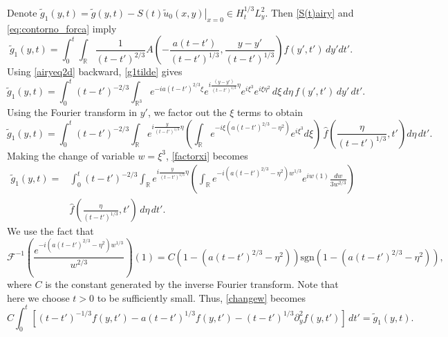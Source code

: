 \documentclass[11pt]{article}
\numberwithin{equation}{section}
\begin{document}
Denote $\tilde{g}_1(y,t) = \tilde{g}(y,t) - \left. S(t)\tilde{u}_0(x,y) \right|_{x=0} \in H^{1/3}_{t}L^{2}_{y}$. Then \eqref{S(t)airy} and \eqref{eq:contorno_forca} imply
\begin{equation}\label{g1tilde}
    \tilde{g}_1(y,t)=\int_0^t \int_{\mathbb{R}} \frac{1}{(t-t')^{2/3}} A\left( -\frac{a(t-t')}{(t-t')^{1/3}}, \frac{y-y'}{(t-t')^{1/3}} \right) f(y', t') \, dy' dt'.
\end{equation}
Using \eqref{airyeq2d} backward, \eqref{g1tilde} gives
\begin{equation}
\tilde{g}_1(y,t)=\int_{0}^{t} (t-t')^{-2/3} \int_{\mathbb{R}^3} e^{-ia(t-t')^{2/3}\xi} e^{i \frac{(y-y')}{(t-t')^{1/3}} \eta} e^{i \xi^3} e^{i \xi\eta^2} \, d\xi \, d\eta \, f(y', t') \, dy' \, dt'.\end{equation}
Using the Fourier transform in $y'$, we factor out the $\xi$ terms to obtain
\begin{equation}\label{factorxi}
\tilde{g}_1(y,t)=\int_{0}^{t} (t-t')^{-2/3} \int_{\mathbb{R}} e^{i \frac{y}{(t-t')^{1/3}} \eta}\left(\int_{\mathbb{R}} e^{-i \xi \left(a(t-t')^{2/3} - \eta^2\right)} e^{i \xi^3} d\xi\right)\, \hat{f} \left( \frac{\eta}{(t-t')^{1/3}}, t' \right) d\eta \, dt'.\end{equation}
Making the change of variable $w = \xi^3$, \eqref{factorxi} becomes
\begin{equation}\label{changew}\begin{aligned}
\tilde{g}_1(y,t)=&\int_{0}^{t} (t-t')^{-2/3} \int_{\mathbb{R}} e^{i \frac{y}{(t-t')^{1/3}} \eta} \left(\int_{\mathbb{R}}e^{-i \left(a(t-t')^{2/3} - \eta^2\right) w^{1/3}} e^{iw(1)}\frac{dw}{3w^{2/3}}\right)\\ &\hat{f}\left(\frac{\eta}{(t-t')^{1/3}}, t'\right) \, d\eta \, dt'.\end{aligned}\end{equation}
We use the fact that
\begin{equation}
    \mathcal{F}^{-1} \left( \frac{e^{-i (a(t-t')^{2/3} - \eta^2) w^{1/3}}}{w^{2/3}} \right) (1) = C \left( 1 - (a(t-t')^{2/3} - \eta^2) \right) \text{sgn}\left( 1 - (a(t-t')^{2/3} - \eta^2) \right),
\end{equation}
where $C$ is the constant generated by the inverse Fourier transform. Note that here we choose $t>0$ to be sufficiently small. Thus, \eqref{changew} becomes
\begin{equation}\label{eqresfor} C \int_{0}^{t}\left[ (t-t')^{-1/3} f(y,t') -a(t-t')^{1/3} f(y,t') - (t-t')^{1/3} \partial_y^2 f(y,t')\right] \, dt'=\tilde{g}_{1}(y,t).\end{equation}
\end{document}

